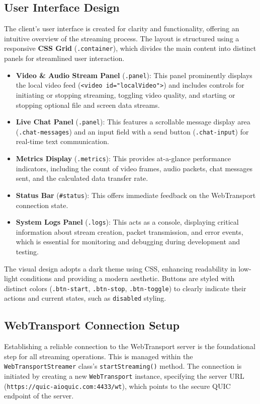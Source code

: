 \subsection{User Interface Design}
The client's user interface is created for clarity and functionality, offering an intuitive overview of the streaming process. The layout is structured using a responsive \textbf{CSS Grid} (\texttt{.container}), which divides the main content into distinct panels for streamlined user interaction.

\begin{itemize}
    \item \textbf{Video \& Audio Stream Panel} (\texttt{.panel}): This panel prominently displays the local video feed (\texttt{<video id="localVideo">}) and includes controls for initiating or stopping streaming, toggling video quality, and starting or stopping optional file and screen data streams.
    \item \textbf{Live Chat Panel} (\texttt{.panel}): This features a scrollable message display area (\texttt{.chat-\allowbreak{}messages}) and an input field with a send button (\texttt{.chat-input}) for real-time text communication.
    \item \textbf{Metrics Display} (\texttt{.metrics}): This provides at-a-glance performance indicators, including the count of video frames, audio packets, chat messages sent, and the calculated data transfer rate.
    \item \textbf{Status Bar} (\texttt{\#status}): This offers immediate feedback on the WebTransport connection state.
    \item \textbf{System Logs Panel} (\texttt{.logs}): This acts as a console, displaying critical information about stream creation, packet transmission, and error events, which is essential for monitoring and debugging during development and testing.
\end{itemize}

The visual design adopts a dark theme using CSS, enhancing readability in low-light conditions and providing a modern aesthetic. Buttons are styled with distinct colors (\texttt{.btn-start}, \texttt{.btn-stop}, \texttt{.btn-toggle}) to clearly indicate their actions and current states, such as \texttt{disabled} styling.

\subsection{WebTransport Connection Setup}
Establishing a reliable connection to the WebTransport server is the foundational step for all streaming operations. This is managed within the \texttt{WebTransportStreamer} class's \texttt{startStreaming()} method. The connection is initiated by creating a new \texttt{WebTransport} instance, specifying the server URL (\texttt{https://quic-aioquic.com:4433/wt}), which points to the secure QUIC endpoint of the server.

